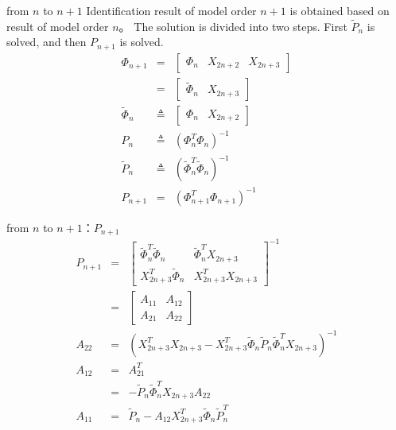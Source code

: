 \begin{frame}{from $n$ to $n+1$}
Identification result of model order $n+1$ is obtained based on result of model order $n$。
 The solution is divided into two steps. First $\tilde P_n$ is solved, and then  $P_{n+1}$ is solved.
\begin{eqnarray*}
\Phi_{n+1} &=& \begin{bmatrix} \Phi_{n} & X_{2n+2} & X_{2n+3} \end{bmatrix} \\
 &=& \begin{bmatrix} \tilde\Phi_{n} & X_{2n+3} \end{bmatrix} \\
\tilde\Phi_n &\triangleq& \begin{bmatrix} \Phi_{n} & X_{2n+2} \end{bmatrix}  \\
P_n &\triangleq& (\Phi_{n}^T\Phi_{n})^{-1} \\
\tilde{P}_n &\triangleq& (\tilde\Phi_{n}^T\tilde\Phi_{n})^{-1}  \\
P_{n+1} &=& (\Phi_{n+1}^T\Phi_{n+1})^{-1} 
\end{eqnarray*}
\end{frame}

\begin{frame}{from $n$ to $n+1$：$P_{n+1}$}
\begin{eqnarray*}
P_{n+1} &=& 
\begin{bmatrix}
\tilde\Phi_n^T\tilde\Phi_n & \tilde\Phi_n^T X_{2n+3} \\
X_{2n+3}^T\tilde\Phi_n    & X_{2n+3}^T X_{2n+3}
\end{bmatrix}^{-1} \\
&=& \begin{bmatrix} A_{11} & A_{12} \\ A_{21} & A_{22} \end{bmatrix} \\
A_{22} &=& (X_{2n+3}^T X_{2n+3}-X_{2n+3}^T\tilde\Phi_n\tilde{P}_n\tilde\Phi_n^T X_{2n+3})^{-1} \\
A_{12} &=& A_{21}^T \\
&=& -\tilde{P}_n\tilde\Phi_n^T X_{2n+3} A_{22} \\
A_{11} &=& \tilde{P}_n- A_{12} X_{2n+3}^T\tilde\Phi_n \tilde{P}_n^T
\end{eqnarray*}
\end{frame}

